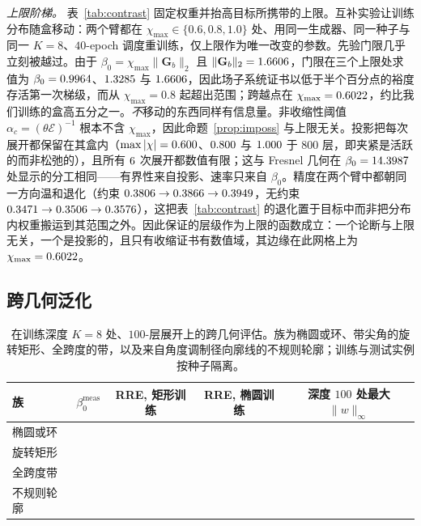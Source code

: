 \documentclass[UTF8,a4paper,11pt]{ctexart}
\newcommand{\norm}[1]{\lVert #1 \rVert}
\newcommand{\numv}[1]{#1}
\begin{document}
\emph{上限阶梯。} 表~\ref{tab:contrast} 固定权重并抬高目标所携带的上限。互补实验让训练分布随盒移动：两个臂都在 $\chi_{\max}\in\{0.6,0.8,1.0\}$ 处、用同一生成器、同一种子与同一 $K=8$、$40$-epoch 调度重训练，仅上限作为唯一改变的参数。先验门限几乎立刻被越过。由于 $\beta_0=\chi_{\max}\norm{\mathbf{G}_b}_2$ 且 $\norm{\mathbf{G}_b}_2=\numv{\NumBoxGb}$，门限在三个上限处求值为 $\beta_0=\numv{\NumBoxBetaSixty}$、$\numv{\NumBoxBetaEighty}$ 与 $\numv{\NumBoxBetaHundred}$，因此场子系统证书以低于半个百分点的裕度存活第一次梯级，而从 $\chi_{\max}=0.8$ 起超出范围；跨越点在 $\chi_{\max}=\numv{\NumBoxEdge}$，约比我们训练的盒高五分之一。\emph{不}移动的东西同样有信息量。非收缩性阈值 $\alpha_c=(\theta\mathcal{E})^{-1}$ 根本不含 $\chi_{\max}$，因此命题~\ref{prop:imposs} 与上限无关。投影把每次展开都保留在其盒内（$\max|\chi|=\numv{\NumBoxChiConsSixty}$、$\numv{\NumBoxChiConsEighty}$ 与 $\numv{\NumBoxChiConsHundred}$ 于 $800$ 层，即夹紧是活跃的而非松弛的），且所有 $\numv{\NumBoxRuns}$ 次展开都数值有限；这与 Fresnel 几何在 $\beta_0=\numv{\NumFresnelBeta}$ 处显示的分工相同——有界性来自投影、速率只来自 $\beta_0$。精度在两个臂中都朝同一方向温和退化（约束 $\numv{\NumBoxRreConsSixty}\to\numv{\NumBoxRreConsEighty}\to\numv{\NumBoxRreConsHundred}$，无约束 $\numv{\NumBoxRreUncSixty}\to\numv{\NumBoxRreUncEighty}\to\numv{\NumBoxRreUncHundred}$），这把表~\ref{tab:contrast} 的退化置于目标中而非把分布内权重搬运到其范围之外。因此保证的层级作为上限的函数成立：一个论断与上限无关，一个是投影的，且只有收缩证书有数值域，其边缘在此网格上为 $\chi_{\max}=\numv{\NumBoxEdge}$。

\subsection{跨几何泛化}
\label{sec:geom}

\begin{table}[htbp]
\centering
\caption{在训练深度 $K=8$ 处、$100$-层展开上的跨几何评估。族为椭圆或环、带尖角的旋转矩形、全跨度的带，以及来自角度调制径向廓线的不规则轮廓；训练与测试实例按种子隔离。}
\label{tab:geom}
\small
\setlength{\tabcolsep}{4pt}
\begin{tabular}{lcccc}
\toprule
族 & $\beta_0^{\mathrm{meas}}$ & RRE, 矩形训练 & RRE, 椭圆训练 & 深度 $100$ 处最大 $\|w\|_\infty$ \\
\midrule
椭圆或环 & \numv{\NumBetaGeomEll}    & \numv{\NumRreRectEll}    & \numv{\NumRreEllEll}    & \numv{\NumMaxWGeomEll} \\
旋转矩形 & \numv{\NumBetaGeomRect}   & \numv{\NumRreRectRect}   & \numv{\NumRreEllRect}   & \numv{\NumMaxWGeomRect} \\
全跨度带    & \numv{\NumBetaGeomStripe} & \numv{\NumRreRectStripe} & \numv{\NumRreEllStripe} & \numv{\NumMaxWGeomStripe} \\
不规则轮廓 & \numv{\NumBetaGeomBlob}   & \numv{\NumRreRectBlob}   & \numv{\NumRreEllBlob}   & \numv{\NumMaxWGeomBlob} \\
\bottomrule
\end{tabular}
\end{table}
\end{document}
